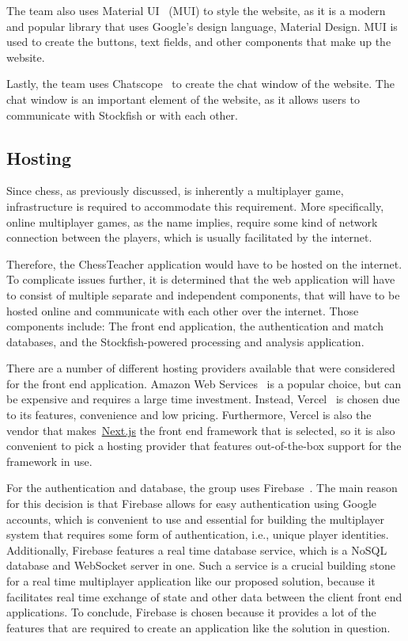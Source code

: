 The team also uses Material UI~\cite{mui} (MUI) to style the website, as it is a modern and popular library that
uses Google's design language, Material Design.
MUI is used to create the buttons, text fields, and other components that make up the website.

Lastly, the team uses Chatscope~\cite{chatscope} to create the chat window of the website.
The chat window is an important element of the website, as it allows users to communicate with Stockfish or with each
other.


\subsection{Hosting}\label{subsec:hosting}

Since chess, as previously discussed, is inherently a multiplayer game,
infrastructure is required to accommodate this requirement.
More specifically, online multiplayer games, as the name implies, require some kind of network connection between the
players, which is usually facilitated by the internet.

Therefore, the ChessTeacher application would have to be hosted on the internet.
To complicate issues further, it is determined that the web application will have to consist of multiple separate and
independent components, that will have to be hosted online and communicate with each other over the internet.
Those components include: The front end application, the authentication and match databases, and the Stockfish-powered
processing and analysis application.

There are a number of different hosting providers available that were considered for the front end application.
Amazon Web Services~\cite{aws} is a popular choice, but can be expensive and requires a large time investment.
Instead, Vercel~\cite{vercel} is chosen due to its features, convenience and low pricing.
Furthermore, Vercel is also the vendor that makes~\url{Next.js} the front end framework that is selected,
so it is also convenient to pick a hosting provider that features out-of-the-box support for the framework in use.

For the authentication and database, the group uses Firebase~\cite{firebase}.
The main reason for this decision is that Firebase allows for easy authentication using Google accounts, which is
convenient to use and essential for building the multiplayer system that requires some form of authentication,
i.e., unique player identities.
Additionally, Firebase features a real time database service, which is a NoSQL database and WebSocket server in one.
Such a service is a crucial building stone for a real time multiplayer application like our proposed solution, because
it facilitates real time exchange of state and other data between the client front end applications.
To conclude, Firebase is chosen because it provides a lot of the features that are required to create an application
like the solution in question.

